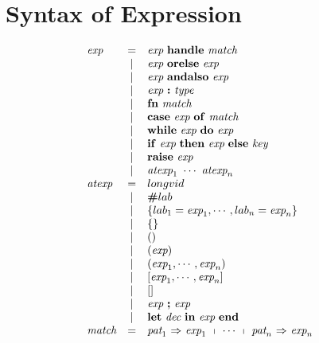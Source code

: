 \documentclass[11pt,a4paper]{article}
\newcommand{\key}[1]{\textrm{\textbf{#1}}}
\newcommand{\prodlhs}[1]{\textit{#1}}
\newcommand{\braced}[1]{\{#1\}}
\begin{document}
\section {Syntax of Expression}
{\renewcommand{\arraystretch}{1.2}\[
\begin{array}{lcll}
\prodlhs{exp}
    & = & \prodlhs{exp}\ \key{handle}\ \prodlhs{match}                              &\\        
    & | & \prodlhs{exp}\ \key{orelse}\ \prodlhs{exp}                                &\\
    & | & \prodlhs{exp}\ \key{andalso}\ \prodlhs{exp}                               &\\
    & | & \prodlhs{exp}\ \key{:}\ \prodlhs{type}                                    &\\
    & | & \key{fn}\ \prodlhs{match}                                                 &\\
    & | & \key{case}\ \prodlhs{exp}\ \key{of}\ \prodlhs{match}                      &\\
    & | & \key{while}\ \prodlhs{exp}\ \key{do}\ \prodlhs{exp}                       &\\
    & | & \key{if}\ \prodlhs{exp}\ \key{then}\ \prodlhs{exp}\ \key{else}\ \prodlhs{key} &\\
    & | & \key{raise}\ \prodlhs{exp}                                                &\\
    & | & \prodlhs{atexp}_1\ \cdots\ \prodlhs{atexp}_n                              &\\
\prodlhs{atexp}
    & = & longvid                                                                   &\\
    & | & \key{\#}lab                                                               &\\
    & | & \braced{lab_1=\prodlhs{exp}_1,\cdots,lab_n=\prodlhs{exp}_n}               &\\
    & | & \braced{}                                                                 &\\
    & | & ()                                                                        &\\
    & | & (\prodlhs{exp})                                                           &\\
    & | & (\prodlhs{exp}_1, \cdots, \prodlhs{exp}_n)                                &\\
    & | & [\prodlhs{exp}_1, \cdots, \prodlhs{exp}_n]                                &\\
    & | & []                                                                        &\\
    & | & \prodlhs{exp}\ \key{;}\ \prodlhs{exp}                                     &\\
    & | & \key{let}\ \prodlhs{dec}\ \key{in}\ \prodlhs{exp}\ \key{end}              &\\
\prodlhs{match}
    & = & \prodlhs{pat}_1\ \key{$\Rightarrow$}\ \prodlhs{exp}_1\ \shortmid\ \cdots\ \shortmid\ \prodlhs{pat}_n\ \key{$\Rightarrow$}\ \prodlhs{exp}_n & \\
\end{array}
\]}
\end{document}
